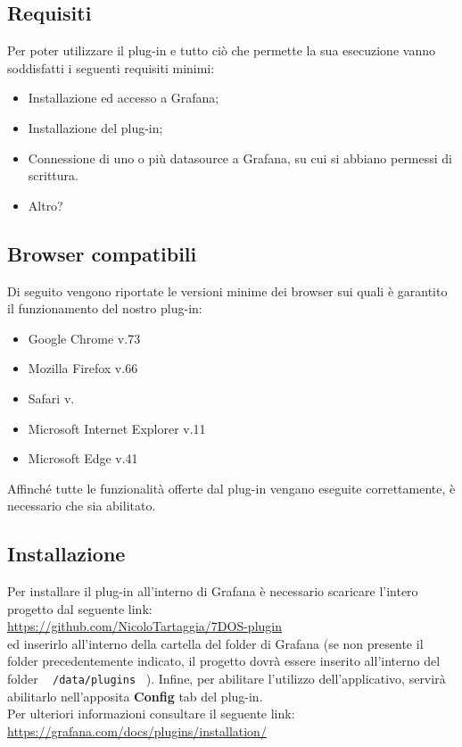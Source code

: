 \subsection{Requisiti}
Per poter utilizzare il plug-in e tutto ciò che permette la sua esecuzione vanno soddisfatti i seguenti requisiti minimi:
\begin{itemize}
	\item{Installazione ed accesso a Grafana;}
	\item{Installazione del plug-in;}
	\item{Connessione di uno o più datasource a Grafana, su cui si abbiano permessi di scrittura.}
	\item{Altro?} 
\end{itemize}
\subsection{Browser compatibili}
Di seguito vengono riportate le versioni minime dei browser sui quali è garantito il funzionamento del nostro plug-in:
\begin{itemize}
	\item{Google Chrome v.73}
	\item{Mozilla Firefox v.66}
	\item{Safari v.}
	\item{Microsoft Internet Explorer v.11}
	\item{Microsoft Edge v.41} \\
\end{itemize}

Affinché tutte le funzionalità offerte dal plug-in vengano eseguite correttamente, è necessario che  sia abilitato.
\subsection{Installazione}
Per installare il plug-in all'interno di Grafana è necessario scaricare l'intero progetto dal seguente link: \\[0.2cm]
\hspace*{10mm}\url{https://github.com/NicoloTartaggia/7DOS-plugin}\\[0.2cm]
ed inserirlo all'interno della cartella  del folder di Grafana (se non presente il folder precedentemente indicato, il progetto dovrà essere inserito all'interno del folder ~ \texttt{/data/plugins} ~).
Infine, per abilitare l'utilizzo dell'applicativo, servirà abilitarlo nell'apposita \textbf{Config} tab del plug-in.\\
Per ulteriori informazioni consultare il seguente link:\\[0.2cm]
\hspace*{10mm}
\url{https://grafana.com/docs/plugins/installation/}
\pagebreak
